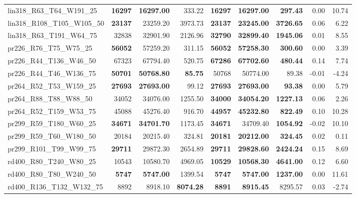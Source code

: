\documentclass{singlecol-new}
\begin{document}
\begin{scriptsize}
\begin{longtable}{lrrrrrrrr}
		lin318\_R63\_T64\_W191\_25 & \textbf{16297} & \textbf{16297.00} & 333.22 & \textbf{16297} & \textbf{16297.00} & \textbf{297.43} & 0.00 & 10.74 \\
		lin318\_R108\_T105\_W105\_50 & \textbf{23137} & 23259.20 & 3973.73 & \textbf{23137} & \textbf{23245.00} & \textbf{3726.65} & 0.06 & 6.22 \\
		lin318\_R63\_T191\_W64\_75 & 32838 & 32901.90 & 2126.96 & \textbf{32790} & \textbf{32899.40} & \textbf{1945.06} & 0.01 & 8.55 \\
		pr226\_R76\_T75\_W75\_25 & \textbf{56052} & 57259.20 & 311.15 & \textbf{56052} & \textbf{57258.30} & \textbf{300.60} & 0.00 & 3.39 \\
		pr226\_R44\_T136\_W46\_50 & 67323 & 67794.40 & 520.75 & \textbf{67286} & \textbf{67702.60} & \textbf{480.44} & 0.14 & 7.74 \\
		pr226\_R44\_T46\_W136\_75 & \textbf{50701} & \textbf{50768.80} & \textbf{85.75} & 50768 & 50774.00 & 89.38 & -0.01 & -4.24 \\
		pr264\_R52\_T53\_W159\_25 & \textbf{27693} & \textbf{27693.00} & 99.12 & \textbf{27693} & \textbf{27693.00} & \textbf{93.38} & 0.00 & 5.79 \\
		pr264\_R88\_T88\_W88\_50 & 34052 & 34076.00 & 1255.50 & \textbf{34000} & \textbf{34054.20} & \textbf{1227.13} & 0.06 & 2.26 \\
		pr264\_R52\_T159\_W53\_75 & 45088 & 45276.40 & 916.70 & \textbf{44957} & \textbf{45232.80} & \textbf{822.49} & 0.10 & 10.28 \\
		pr299\_R59\_T180\_W60\_25 & \textbf{34671} & \textbf{34701.70} & 1173.45 & \textbf{34671} & 34709.40 & \textbf{1054.92} & -0.02 & 10.10 \\
		pr299\_R59\_T60\_W180\_50 & 20184 & 20215.40 & 324.81 & \textbf{20181} & \textbf{20212.00} & \textbf{324.45} & 0.02 & 0.11 \\
		pr299\_R101\_T99\_W99\_75 & \textbf{29711} & 29872.30 & 2654.89 & \textbf{29711} & \textbf{29828.60} & \textbf{2424.24} & 0.15 & 8.69 \\
		rd400\_R80\_T240\_W80\_25 & 10543 & 10580.70 & 4969.05 & \textbf{10529} & \textbf{10568.30} & \textbf{4641.00} & 0.12 & 6.60 \\
		rd400\_R80\_T80\_W240\_50 & \textbf{5747} & \textbf{5747.00} & 1399.54 & \textbf{5747} & \textbf{5747.00} & \textbf{1237.00} & 0.00 & 11.61 \\
		rd400\_R136\_T132\_W132\_75 & 8892 & 8918.10 & \textbf{8074.28} & \textbf{8891} & \textbf{8915.45} & 8295.57 & 0.03 & -2.74 \\

\end{longtable}
\end{scriptsize}
\end{document}
